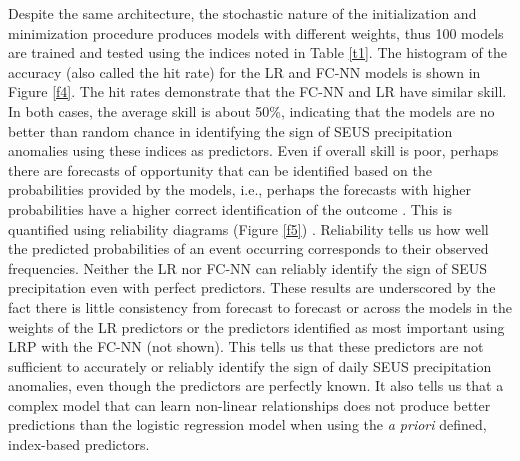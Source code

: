 \documentclass{ametsocV6.1}
\begin{document}
Despite the same architecture, the stochastic nature of the initialization and minimization procedure produces models with different weights, thus 100 models are trained and tested using the indices noted in Table \ref{t1}. The histogram of the accuracy (also called the hit rate) for the LR and FC-NN models is shown in Figure \ref{f4}. The hit rates demonstrate that the FC-NN and LR have similar skill. In both cases, the average skill is about 50\%, indicating that the models are no better than random chance in identifying the sign of SEUS precipitation anomalies using these indices as predictors. Even if overall skill is poor, perhaps there are forecasts of opportunity that can be identified based on the probabilities provided by the models, i.e., perhaps the forecasts with higher probabilities have a higher correct identification of the outcome \citep[e.g.,][]{mayer_subseasonal_2021}. This is quantified using reliability diagrams (Figure \ref{f5}) \citep{murphy_reliability_1977}. Reliability tells us how well the predicted probabilities of an event occurring corresponds to their observed frequencies. Neither the LR nor FC-NN can reliably identify the sign of SEUS precipitation even with perfect predictors. These results are underscored by the fact there is little consistency from forecast to forecast or across the models in the weights of the LR predictors or the predictors identified as most important using LRP with the FC-NN (not shown). This tells us that these predictors are not sufficient to accurately or reliably identify the sign of daily SEUS precipitation anomalies, even though the predictors are perfectly known. It also tells us that a complex model that can learn non-linear relationships does not produce better predictions than the logistic regression model when using the \emph{a priori} defined, index-based predictors.
\end{document}
